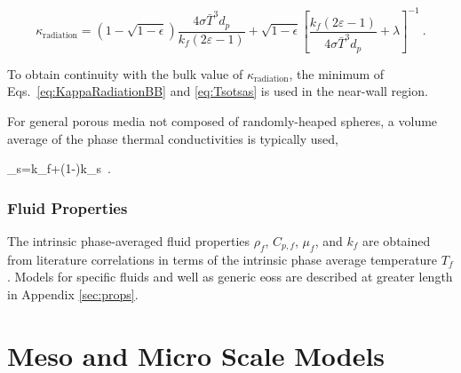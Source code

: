 \begin{equation}
\label{eq:Tsotsas}
\kappa_\text{radiation}=\left(1-\sqrt{1-\epsilon}\right)\frac{4\sigma\bar{T}^3d_p}{k_f\left(2\varepsilon-1\right)}+\sqrt{1-\epsilon}\left\lbrack\frac{k_f\left(2\varepsilon-1\right)}{4\sigma\bar{T}^3d_p}+\lambda\right\rbrack^{-1}\ .
\end{equation}

\noindent To obtain continuity with the bulk value of \(\kappa_\text{radiation}\), the minimum of Eqs.\ \eqref{eq:KappaRadiationBB} and \eqref{eq:Tsotsas} is used in the near-wall region.

For general porous media not composed of randomly-heaped spheres, a volume average of the phase thermal conductivities is typically used,

\beq
\label{eq:VolumeAverageKappaSolid}
\kappa_s=\epsilon k_f+(1-\epsilon)k_s\ .
\eeq

\subsubsection{Fluid Properties}
\label{sec:FPs}

The intrinsic phase-averaged fluid properties \(\rho_f\), \(C_{p,f}\), \(\mu_f\), and \(k_f\) are obtained from literature correlations in terms of the intrinsic phase average temperature \(T_f\). Models for specific fluids and well as generic \glspl{eos} are described at greater length in Appendix \ref{sec:props}.

\section{Meso and Micro Scale Models}
\label{sec:mesomicro}

